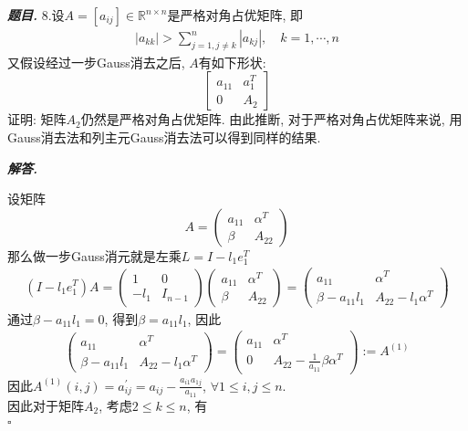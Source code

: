 \documentclass[10pt, a4paper, oneside]{ctexart}
\newenvironment{problem}{\begin{framed}\par\noindent\textbf{\textit{题目. }}}{\end{framed}\par}
\newenvironment{solution}{%
  \par\noindent\textbf{\textit{解答. }}\ignorespaces
}{%
  \hfill\ensuremath{\square}\par %
}
\begin{document}
\begin{problem}
    8.设$A=[a_{ij}]\in \mathbb{R}^{n\times n}$是严格对角占优矩阵, 即
    \begin{align*}
        |a_{kk}|>\sum_{j=1, j\neq k}^{n} |a_{kj}|,\quad k=1,\cdots,n
    \end{align*}
    又假设经过一步Gauss消去之后, $A$有如下形状:
    $$\begin{bmatrix}
        a_{11}& a_1^T\\0&A_2
    \end{bmatrix}$$
    证明: 矩阵$A_2$仍然是严格对角占优矩阵. 由此推断, 对于严格对角占优矩阵来说, 用Gauss消去法和列主元Gauss消去法可以得到同样的结果.
\end{problem}
\begin{solution}
设矩阵
$$A=\begin{pmatrix}
    a_{11}&\alpha^T\\\beta&A_{22}
\end{pmatrix}$$
那么做一步Gauss消元就是左乘$L = I - l_1e_1^T$
\begin{align*}
    (I - l_1e_1^T)A = \begin{pmatrix}
       1&0\\ -l_1 & I_{n-1} 
    \end{pmatrix} \begin{pmatrix}
        a_{11}&\alpha^T\\\beta&A_{22}
    \end{pmatrix}=\begin{pmatrix}
        a_{11}&\alpha^T\\ \beta-a_{11}l_1& A_{22}-l_1\alpha^T
    \end{pmatrix}
\end{align*}
通过$\beta-a_{11}l_1=0$, 得到$\beta=a_{11}l_1$, 因此
\begin{align*}
    \begin{pmatrix}
        a_{11}&\alpha^T\\ \beta-a_{11}l_1& A_{22}-l_1\alpha^T
    \end{pmatrix}=\begin{pmatrix}
        a_{11}&\alpha^T\\ 0& A_{22}-\frac{1}{a_{11}}\beta\alpha^T
    \end{pmatrix}:= A^{(1)}
\end{align*}
因此$A^{(1)}(i,j)=a_{ij}^{\prime}=a_{ij}-\frac{a_{i1}a_{1j}}{a_{11}}$, $\forall 1\leq i,j\leq n$.\\
因此对于矩阵$A_2$, 考虑$2\leq k\leq n$, 有
\begin{align*}

\end{align*}
\end{solution}
\end{document}
